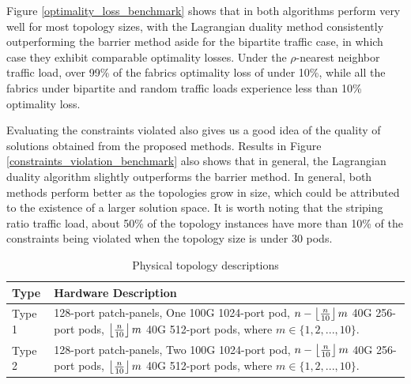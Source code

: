 \documentclass[sigconf]{acmart}
\theoremstyle{definition}
\begin{document}
Figure \ref{optimality_loss_benchmark} shows that in both algorithms perform very well for most topology sizes, with the Lagrangian duality method consistently outperforming the barrier method aside for the bipartite traffic case, in which case they exhibit comparable optimality losses. Under the $\rho$-nearest neighbor traffic load, over 99\% of the fabrics optimality loss of under 10\%, while all the fabrics under bipartite and random traffic loads experience less than 10\% optimality loss.

Evaluating the constraints violated also gives us a good idea of the quality of solutions obtained from the proposed methods. Results in Figure \ref{constraints_violation_benchmark} also shows that in general, the Lagrangian duality algorithm slightly outperforms the barrier method. In general, both methods perform better as the topologies grow in size, which could be attributed to the existence of a larger solution space. It is worth noting that the striping ratio traffic load, about 50\% of the topology instances have more than 10\% of the constraints being violated when the topology size is under 30 pods.


\begin{table}
\begin{tabular}{|p{1.5cm}|p{6.4cm}|}
\hline
\textbf{Type} & \textbf{Hardware Description} \\
\hline\hline
{Type 1} & 128-port patch-panels, One 100G 1024-port pod, $n - \left\lfloor \frac{n}{10} \right\rfloor m$ 40G 256-port pods, $\left\lfloor \frac{n}{10} \right\rfloor m$ 40G 512-port pods, where $m \in \{1, 2, ..., 10\}$.\\
\hline
{Type 2} & 128-port patch-panels, Two 100G 1024-port pod, $n - \left\lfloor \frac{n}{10} \right\rfloor m$ 40G 256-port pods, $\left\lfloor \frac{n}{10} \right\rfloor m$ 40G 512-port pods, where $m \in \{1, 2, ..., 10\}$.\\
\hline
\end{tabular}
\caption{Physical topology descriptions} 
\label{topology_description}
\end{table}
\end{document}
